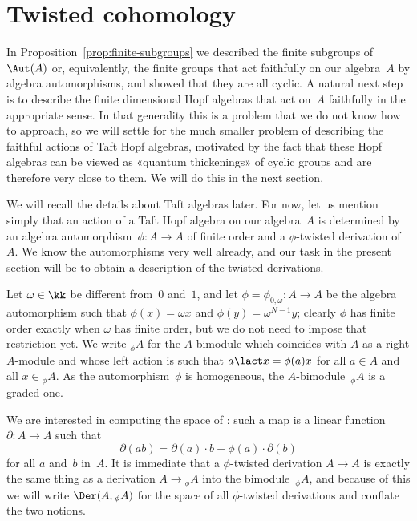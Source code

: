 \section{Twisted cohomology}
\label{sect:twist}

In Proposition~\ref{prop:finite-subgroups} we described the finite
subgroups of~$\Aut(A)$ or, equivalently, the finite groups that act
faithfully on our algebra~$A$ by algebra automorphisms, and showed that
they are all cyclic. A natural next step is to describe the finite
dimensional Hopf algebras that act on~$A$ faithfully in the appropriate
sense. In that generality this is a problem that we do not know how to
approach, so we will settle for the much smaller problem of describing the
faithful actions of Taft Hopf algebras, motivated by the fact that these
Hopf algebras can be viewed as «quantum thickenings» of cyclic groups and
are therefore very close to them. We will do this in the next section.

We will recall the details about Taft algebras later. For now, let us
mention simply that an action of a Taft Hopf algebra on our algebra~$A$ is
determined by an algebra automorphism~$\phi:A\to A$ of finite order and a
$\phi$-twisted derivation of~$A$. We know the automorphisms very well
already, and our task in the present section will be to obtain a
description of the twisted derivations.

\bigskip

Let $\omega\in\kk$ be different from~$0$ and~$1$, and let
$\phi=\phi_{0,\omega}:A\to A$ be the algebra automorphism such that
$\phi(x)=\omega x$ and $\phi(y)=\omega^{N-1}y$; clearly $\phi$ has finite
order exactly when $\omega$ has finite order, but we do not need to impose
that restriction yet. We write ${}_\phi A$ for the $A$-bimodule which
coincides with $A$ as a right $A$-module and whose left action is such that
$a\lact x=\phi(a)x$ for all $a\in A$ and all $x\in{}_\phi A$. As the
automorphism~$\phi$ is homogeneous, the $A$-bimodule~${}_\phi A$ is a
graded one. 

We are interested in computing the space of : such a map is a linear function $\partial:A\to A$ such that 
  \[ 
  \partial(ab) = \partial(a)\cdot b+\phi(a)\cdot\partial(b) 
  \] 
for all $a$ and~$b$ in~$A$. It is immediate that a $\phi$-twisted
derivation $A\to A$ is exactly the same thing as a derivation $A\to{}_\phi A$
into the bimodule~${}_\phi A$, and because of this we will write
$\Der(A,{}_\phi A)$ for the space of all $\phi$-twisted derivations and
conflate the two notions.

